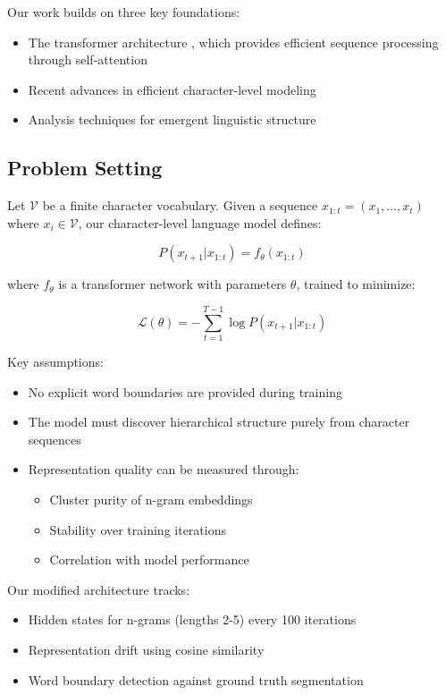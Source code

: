 \documentclass{article} %
\begin{document}
Our work builds on three key foundations:
\begin{itemize}
    \item The transformer architecture \citep{vaswani2017attention}, which provides efficient sequence processing through self-attention
    \item Recent advances in efficient character-level modeling \citep{karpathy2023nanogpt,Al-Rfou2018CharacterLevelLM}
    \item Analysis techniques for emergent linguistic structure \citep{Gulordava2018ColorlessGR}
\end{itemize}

\subsection{Problem Setting}
Let $\mathcal{V}$ be a finite character vocabulary. Given a sequence $x_{1:t} = (x_1, \ldots, x_t)$ where $x_i \in \mathcal{V}$, our character-level language model defines:

\begin{equation}
    P(x_{t+1}|x_{1:t}) = f_\theta(x_{1:t})
\end{equation}

where $f_\theta$ is a transformer network with parameters $\theta$, trained to minimize:

\begin{equation}
    \mathcal{L}(\theta) = -\sum_{t=1}^{T-1} \log P(x_{t+1}|x_{1:t})
\end{equation}

Key assumptions:
\begin{itemize}
    \item No explicit word boundaries are provided during training
    \item The model must discover hierarchical structure purely from character sequences
    \item Representation quality can be measured through:
    \begin{itemize}
        \item Cluster purity of n-gram embeddings
        \item Stability over training iterations
        \item Correlation with model performance
    \end{itemize}
\end{itemize}

Our modified architecture tracks:
\begin{itemize}
    \item Hidden states for n-grams (lengths 2-5) every 100 iterations
    \item Representation drift using cosine similarity
    \item Word boundary detection against ground truth segmentation
\end{itemize}
\end{document}
